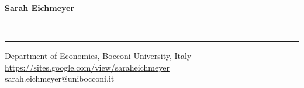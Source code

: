\documentclass[letterpaper,11pt]{article}
\begin{document}
\vspace{-0.3cm}
\begin{center}
\begin{huge}
\textbf{Sarah Eichmeyer}
\end{huge} \\
   \begin{normalsize}
\noindent\rule{\textwidth}{1pt}
Department of Economics, Bocconi University, Italy \\
\href{https://sites.google.com/view/saraheichmeyer}{https://sites.google.com/view/saraheichmeyer} \\
sarah.eichmeyer@unibocconi.it \\
\end{normalsize}
\end{center}
   \begin{normalsize}
   
 \medskip

\noindent
{ %

}
\end{normalsize}
\end{document}
